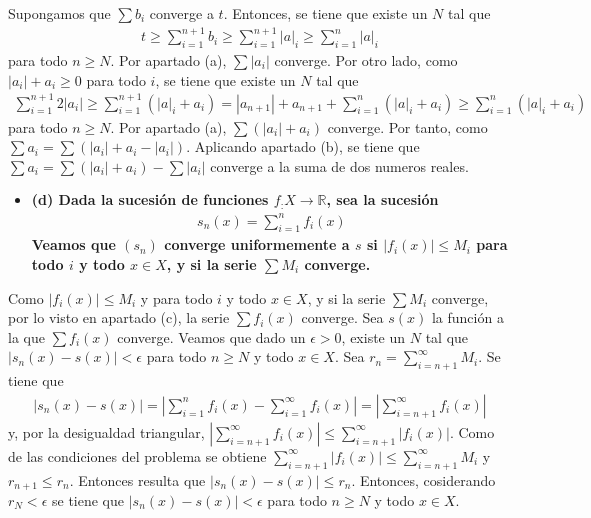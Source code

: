 \documentclass{article}
\begin{document}
Supongamos que $\sum b_i$ converge a $t$. Entonces, se tiene que existe un $N$ tal que
\begin{eqnarray}
t\geq\sum^{n+1}_{i=1}b_i\geq \sum^{n+1}_{i=1}|a|_i\geq \sum^n_{i=1}|a|_i\nonumber
\end{eqnarray}
para todo $n\geq N$. Por apartado (a), $\sum |a_i|$ converge. Por otro lado, como $|a_i|+a_i\geq 0$ para todo $i$, se tiene que existe un $N$ tal que
\begin{eqnarray}
\sum^{n+1}_{i=1}2|a_i|\geq \sum^{n+1}_{i=1}(|a|_i+a_i)=|a_{n+1}|+a_{n+1}+\sum^{n}_{i=1}(|a|_i+a_i)\geq \sum^n_{i=1}(|a|_i+a_i)\nonumber
\end{eqnarray}
para todo $n\geq N$. Por apartado (a), $\sum (|a_i|+a_i)$ converge. Por tanto, como $\sum a_i=\sum (|a_i|+a_i-|a_i|)$. Aplicando apartado (b), se tiene que $\sum a_i=\sum (|a_i|+a_i)-\sum |a_i|$ converge a la suma de dos numeros reales.
\begin{itemize}
\item \bf (d) \rm Dada la sucesión de funciones $f_:X\rightarrow \mathbb{R}$, sea la sucesión
\begin{eqnarray}
s_n(x)=\sum^{n}_{i=1}f_i(x)\nonumber
\end{eqnarray}
Veamos que $(s_n)$ converge uniformemente a $s$ si $|f_i(x)|\leq M_i$ para todo $i$ y todo $x\in X$, y si la serie $\sum M_i$ converge.
\end{itemize}
Como  $|f_i(x)|\leq M_i$ y para todo $i$ y todo $x\in X$, y si la serie $\sum M_i$ converge, por lo visto en apartado (c), la serie $\sum f_i(x)$ converge. Sea $s(x)$ la función a la que $\sum f_i(x)$ converge. Veamos que dado un $\epsilon>0$, existe un $N$ tal que $|s_n(x)-s(x)|<\epsilon$   para todo $n\geq N$ y todo $x\in X$. Sea $r_n=\sum_{i=n+1}^{\infty}M_i$. Se tiene que 
\begin{eqnarray}
|s_n(x)-s(x)|=|\sum_{i=1}^{n}f_i(x)-\sum_{i=1}^{\infty}f_i(x)|=|\sum_{i=n+1}^{\infty}f_i(x)|\nonumber
\end{eqnarray}
y, por la desigualdad triangular, $|\sum_{i=n+1}^{\infty}f_i(x)|\leq \sum_{i=n+1}^{\infty}|f_i(x)|$. Como de las condiciones del problema se obtiene $\sum_{i=n+1}^{\infty}|f_i(x)|\leq \sum_{i=n+1}^{\infty}M_i$ y $r_{n+1}\leq r_n$. Entonces resulta que $|s_n(x)-s(x)|\leq r_n$. Entonces, cosiderando $r_N<\epsilon$ se tiene que $|s_n(x)-s(x)|<\epsilon$ para todo $n\geq N$ y todo $x\in X$.
\end{document}
